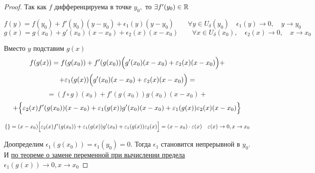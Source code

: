 \begin{proof}
    Так как $f$ дифференцируема в точке $y_{0},$ то $\exists f'(y_{0}) \in \R$

    $$
    f(y) = f(y_{0}) + f'(y_{0})(y-y_{0}) + \epsilon_{1}(y)(y-y_{0}) \quad  \quad   \forall y \in U_{\delta}(y_{0}) \quad \epsilon_{1}(y) \to 0,\quad y\to y_{0}
    $$
    $$
    g(x) = g(x_{0}) + g'(x_{0})(x-x_{0}) + \epsilon_{2}(x)(x-x_{0})  \quad \quad  \forall x \in U_{\delta}(x_{0}),\quad \epsilon_{2}(x) \to 0,\quad  x\to x_{0}
    $$

    Вместо $y$ подставим $g(x)$
    $$
    f(g(x)) = f(g(x_{0})) + f'(g(x_{0}))\Bigl( g'(x_{0})(x-x_{0}) + \epsilon_{2}(x)(x-x_{0})\Bigr) +  $$
    $$
    + \epsilon_{1}(g(x))\Bigl(g'(x_{0})(x-x_{0}) + \epsilon_{2}(x)(x-x_{0})\Bigr) =
    $$
    $$
    = (f\circ g)(x_{0}) + f'(g(x_{0}))g(x_{0})(x-x_{0}) +  $$
    $$+ \Bigl\{ \epsilon_{2}(x)f'(g(x_{0}))(x-x_{0}) + \epsilon_{1}(g(x))g'(x_{0})(x-x_{0}) + \epsilon_{1}(g(x))\epsilon_{2}(x)(x-x_{0}) \Bigr\}$$

    $$
    \{\} = (x-x_{0})\Bigl[\epsilon_{2}(x)f'(g(x_{0})) + \epsilon_{1}(g(x))g'(x_{0}) + \epsilon_{1}(g(x))\epsilon_{2}(x) \Bigr] = (x - x_{0}) \cdot \epsilon(x) \quad \epsilon(x) \to 0, x\to x_{0}
    $$

    Доопределим $\epsilon_{1}(g(x_{0})) = \epsilon_{1}(y_{0}) = 0$. Тогда $\epsilon_{1}$ становится непрерывной в  $y_{0}.$ И \hyperlink{thrm4.18}{по теореме о замене переменной при вычислении предела} $\epsilon_{1}(g(x))\to 0, x\to x_{0}$
\end{proof}

